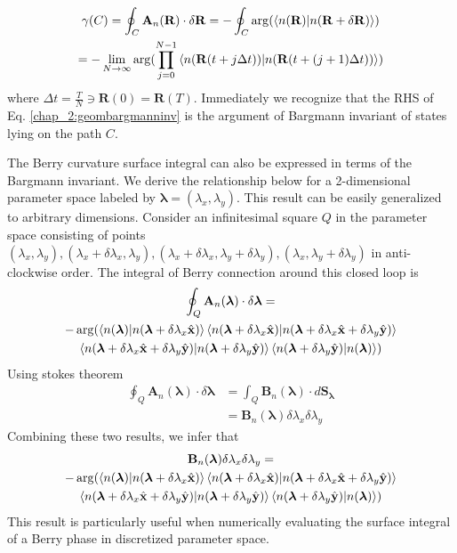 \begin{multline}
 \label{chap_2:geombargmanninv}\gamma(C) = \oint_{C}{\mathbf{A}_{n}(\mathbf{R}) \cdot \delta\mathbf{R}}  = -\oint_{C}{\arg(\braket{n(\mathbf{R})|n(\mathbf{R} +\delta\mathbf{R})})} \\ = -\lim_{N\rightarrow\infty} \arg(\prod_{j=0}^{N-1}{\braket{n(\mathbf{R}(t + j\Delta t))|n(\mathbf{R}(t + (j+1)\Delta t))}})
\end{multline} where $\Delta t = \frac{T}{N} \ni \mathbf{R}(0)=\mathbf{R}(T)$.
Immediately we recognize that the RHS of Eq. \eqref{chap_2:geombargmanninv} is the argument of Bargmann invariant of states lying on the path $C$.

The Berry curvature surface integral can also be expressed in terms of the Bargmann invariant. We derive the relationship below for a 2-dimensional parameter space
labeled by $\bm{\lambda} = (\lambda_x, \lambda_y)$. This result can be easily generalized to arbitrary dimensions. Consider an infinitesimal square $Q$ in the parameter space 
consisting of points $(\lambda_x, \lambda_y), (\lambda_x + \delta\lambda_x, \lambda_y), (\lambda_x + \delta\lambda_x, \lambda_y + \delta\lambda_y), (\lambda_x, \lambda_y+\delta\lambda_y)$
in anti-clockwise order. The integral of Berry connection around this closed loop is
\begin{multline*}
  \oint_{Q}{\mathbf{A}_{n}(\bm{\lambda})\cdot \delta\bm{\lambda}} = \\
  -\arg(\braket{n(\bm{\lambda})|n(\bm{\lambda} + \delta\lambda_x \hat{\mathbf{x}})}\braket{n(\bm{\lambda} + \delta\lambda_x \hat{\mathbf{x}})|n(\bm{\lambda} + \delta\lambda_x \hat{\mathbf{x}} + \delta\lambda_y \hat{\mathbf{y}})}\\ \braket{n(\bm{\lambda} + \delta\lambda_x \hat{\mathbf{x}} + \delta\lambda_y \hat{\mathbf{y}})|n(\bm{\lambda} + \delta\lambda_y \hat{\mathbf{y}})}\braket{n(\bm{\lambda} + \delta\lambda_y \hat{\mathbf{y}})|n(\bm{\lambda})})
\end{multline*}
Using stokes theorem
\begin{align*}
  \oint_{Q}{\mathbf{A}_{n}(\bm{\lambda})\cdot \delta\bm{\lambda}} &= \int_{Q}{\mathbf{B}_{n}(\bm{\lambda})\cdot d\mathbf{S}_{\bm{\lambda}}}\\
  &= \mathbf{B}_{n}(\bm{\lambda}) \delta\lambda_x\delta\lambda_y
\end{align*}
Combining these two results, we infer that\cite{rasta2016geometry}
\begin{multline}
 \mathbf{B}_{n}(\bm{\lambda}) \delta\lambda_x\delta\lambda_y = \\
 -\arg(\braket{n(\bm{\lambda})|n(\bm{\lambda} + \delta\lambda_x \hat{\mathbf{x}})}\braket{n(\bm{\lambda} + \delta\lambda_x \hat{\mathbf{x}})|n(\bm{\lambda} + \delta\lambda_x \hat{\mathbf{x}} + \delta\lambda_y \hat{\mathbf{y}})}\\ \braket{n(\bm{\lambda} + \delta\lambda_x \hat{\mathbf{x}} + \delta\lambda_y \hat{\mathbf{y}})|n(\bm{\lambda} + \delta\lambda_y \hat{\mathbf{y}})}\braket{n(\bm{\lambda} + \delta\lambda_y \hat{\mathbf{y}})|n(\bm{\lambda})})
\end{multline}
This result is particularly useful when numerically evaluating the surface integral of a Berry phase in discretized parameter space.

